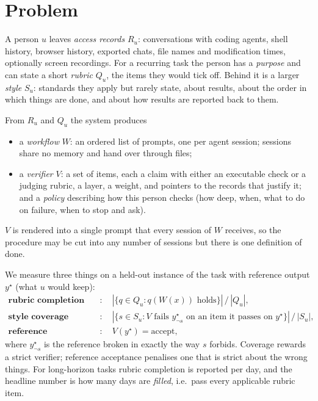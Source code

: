 \documentclass[10pt]{article}
\begin{document}
\section{Problem}
\label{sec:problem}

A person $u$ leaves \emph{access records} $R_u$: conversations with coding agents, shell history, browser history,
exported chats, file names and modification times, optionally screen recordings. For a recurring task the person
has a \emph{purpose} and can state a short \emph{rubric} $Q_u$, the items they would tick off. Behind it is a larger
\emph{style} $S_u$: standards they apply but rarely state, about results, about the order in which things are done,
and about how results are reported back to them.

From $R_u$ and $Q_u$ the system produces
\begin{itemize}
\item a \emph{workflow} $W$: an ordered list of prompts, one per agent session; sessions share no memory and hand
      over through files;
\item a \emph{verifier} $V$: a set of items, each a claim with either an executable check or a judging rubric, a
      layer, a weight, and pointers to the records that justify it; and a \emph{policy} describing how this person
      checks (how deep, when, what to do on failure, when to stop and ask).
\end{itemize}
$V$ is rendered into a single prompt that every session of $W$ receives, so the procedure may be cut into any
number of sessions but there is one definition of done.

We measure three things on a held-out instance of the task with reference output $y^\star$ (what $u$ would keep):
\begin{align*}
\textbf{rubric completion} &:\quad |\{q \in Q_u : q(W(x)) \text{ holds}\}| \,/\, |Q_u|, \\
\textbf{style coverage} &:\quad |\{s \in S_u : V \text{ fails } y^\star_{\neg s} \text{ on an item it passes on } y^\star\}| \,/\, |S_u|,\\
\textbf{reference acceptance} &:\quad V(y^\star) = \text{accept},
\end{align*}
where $y^\star_{\neg s}$ is the reference broken in exactly the way $s$ forbids. Coverage rewards a strict
verifier; reference acceptance penalises one that is strict about the wrong things. For long-horizon tasks rubric
completion is reported per day, and the headline number is how many days are \emph{filled}, i.e.\ pass every
applicable rubric item.
\end{document}
